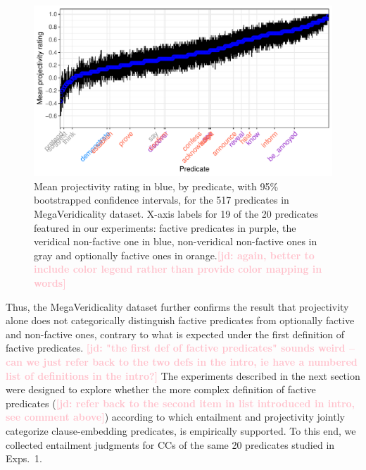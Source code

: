 \documentclass[11pt,fleqn]{article}
\newcommand{\jd}[1]{\textbf{\textcolor{Pink}{[jd: #1]}}}
\newcommand{\6}{\mbox{$[\hspace*{-.6mm}[$}}
\newcommand{\9}{\mbox{$]\hspace*{-.6mm}]$}}
\begin{document}
\begin{figure}[H]
\centering
\includegraphics[width=.75\paperwidth]{../../white-rawlins-data/graphs/means-projection-by-predicate}

\caption{Mean projectivity rating in blue, by predicate, with 95\% bootstrapped confidence intervals, for the 517 predicates in MegaVeridicality dataset. X-axis labels for 19 of the 20 predicates featured in our experiments: factive predicates in purple, the veridical non-factive one in blue, non-veridical non-factive ones in gray and optionally factive ones in orange.\jd{again, better to include color legend rather than provide color mapping in words}}
\label{f-white-rawlins-projectivity}
\end{figure}

Thus, the MegaVeridicality dataset further confirms the result that projectivity alone does not categorically distinguish factive predicates from optionally factive and non-factive ones, contrary to what is expected under the first definition of factive predicates. \jd{"the first def of factive predicates" sounds weird -- can we just refer back to the two defs in the intro, ie have a numbered list of definitions in the intro?} The experiments described in the next section were designed to explore whether the more complex definition of factive predicates (\jd{refer back to the second item in list introduced in intro, see comment above}) according to which entailment and projectivity jointly categorize clause-embedding predicates,  is empirically supported. To this end, we collected entailment judgments for CCs of the same 20 predicates studied in Exps.~1.
\end{document}
